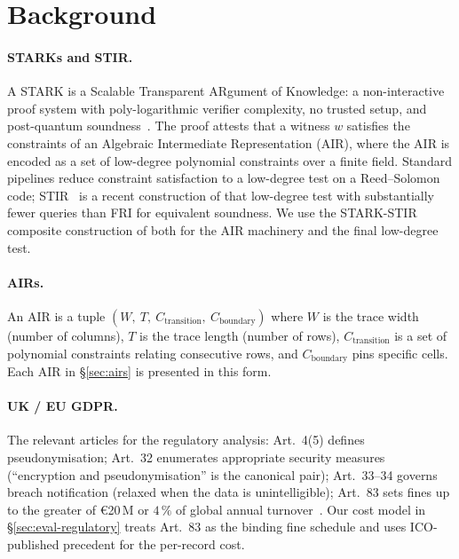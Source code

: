 \documentclass[11pt,a4paper]{article}
\begin{document}
\section{Background}
\label{sec:background}

\paragraph{STARKs and STIR.}  A STARK is a
Scalable Transparent ARgument of Knowledge: a
non\nobreakdash-interactive proof system with poly\nobreakdash-logarithmic
verifier complexity, no trusted setup, and post\nobreakdash-quantum
soundness~\cite{starks}.  The proof attests that a witness
$w$ satisfies the constraints of an Algebraic Intermediate
Representation (AIR), where the AIR is encoded as a set of
low\nobreakdash-degree polynomial constraints over a finite field.
Standard pipelines reduce constraint satisfaction to a low\nobreakdash-degree
test on a Reed--Solomon code; STIR~\cite{stir} is a recent
construction of that low\nobreakdash-degree test with substantially
fewer queries than FRI for equivalent soundness.  We use the
STARK\nobreakdash-STIR composite construction
of \cite{stark-stir} both for the AIR machinery
and the final low\nobreakdash-degree test.

\paragraph{AIRs.}  An AIR is a tuple
$(W,\ T,\ C_\mathrm{transition},\ C_\mathrm{boundary})$ where
$W$ is the trace width (number of columns), $T$ is the trace
length (number of rows), $C_\mathrm{transition}$ is a set of
polynomial constraints relating consecutive rows, and
$C_\mathrm{boundary}$ pins specific cells.  Each AIR in
\S\ref{sec:airs} is presented in this form.

\paragraph{UK / EU GDPR.}  The relevant articles for the
regulatory analysis: Art.~4(5) defines pseudonymisation;
Art.~32 enumerates appropriate security measures
(``encryption and pseudonymisation'' is the canonical pair);
Art.~33--34 governs breach notification (relaxed when the data
is unintelligible); Art.~83 sets fines up to the greater of
\euro20\,M or $4\,\%$ of global annual
turnover~\cite{gdpr,uk-gdpr,ico-fines}.  Our cost model in
\S\ref{sec:eval-regulatory} treats Art.~83 as the binding
fine schedule and uses ICO\nobreakdash-published precedent for
the per\nobreakdash-record cost.
\end{document}
